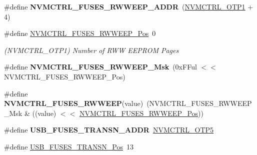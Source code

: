 \begin{DoxyCompactItemize}
\item 
\hypertarget{group__fuses__api_gaeaad17675b84606139dae49e014c6807}{}\#define {\bfseries N\+V\+M\+C\+T\+R\+L\+\_\+\+F\+U\+S\+E\+S\+\_\+\+R\+W\+W\+E\+E\+P\+\_\+\+A\+D\+D\+R}~(\hyperlink{group___s_a_m_l21_j18_a__base_ga6ebf76a96eae94342ff79fce4311baf3}{N\+V\+M\+C\+T\+R\+L\+\_\+\+O\+T\+P1} + 4)\label{group__fuses__api_gaeaad17675b84606139dae49e014c6807}

\item 
\hypertarget{group__fuses__api_ga0b9983a33a9d13a204312f12057b5be8}{}\#define \hyperlink{group__fuses__api_ga0b9983a33a9d13a204312f12057b5be8}{N\+V\+M\+C\+T\+R\+L\+\_\+\+F\+U\+S\+E\+S\+\_\+\+R\+W\+W\+E\+E\+P\+\_\+\+Pos}~0\label{group__fuses__api_ga0b9983a33a9d13a204312f12057b5be8}

\begin{DoxyCompactList}\small\item\em (N\+V\+M\+C\+T\+R\+L\+\_\+\+O\+T\+P1) Number of R\+W\+W E\+E\+P\+R\+O\+M Pages \end{DoxyCompactList}\item 
\hypertarget{group__fuses__api_ga047469bca15d4a60e2b53e25d83b051d}{}\#define {\bfseries N\+V\+M\+C\+T\+R\+L\+\_\+\+F\+U\+S\+E\+S\+\_\+\+R\+W\+W\+E\+E\+P\+\_\+\+Msk}~(0x\+F\+Ful $<$$<$ N\+V\+M\+C\+T\+R\+L\+\_\+\+F\+U\+S\+E\+S\+\_\+\+R\+W\+W\+E\+E\+P\+\_\+\+Pos)\label{group__fuses__api_ga047469bca15d4a60e2b53e25d83b051d}

\item 
\hypertarget{group__fuses__api_ga5482fd133dbb9b043c364773baaab2bf}{}\#define {\bfseries N\+V\+M\+C\+T\+R\+L\+\_\+\+F\+U\+S\+E\+S\+\_\+\+R\+W\+W\+E\+E\+P}(value)~(N\+V\+M\+C\+T\+R\+L\+\_\+\+F\+U\+S\+E\+S\+\_\+\+R\+W\+W\+E\+E\+P\+\_\+\+Msk \& ((value) $<$$<$ \hyperlink{group__fuses__api_ga0b9983a33a9d13a204312f12057b5be8}{N\+V\+M\+C\+T\+R\+L\+\_\+\+F\+U\+S\+E\+S\+\_\+\+R\+W\+W\+E\+E\+P\+\_\+\+Pos}))\label{group__fuses__api_ga5482fd133dbb9b043c364773baaab2bf}

\item 
\hypertarget{group__fuses__api_gac987d8deebc5d8592e0a953fb5d1e9ac}{}\#define {\bfseries U\+S\+B\+\_\+\+F\+U\+S\+E\+S\+\_\+\+T\+R\+A\+N\+S\+N\+\_\+\+A\+D\+D\+R}~\hyperlink{group___s_a_m_l21_j18_a__base_ga0bf5d3de41242cbb1e7b91ef11d6b794}{N\+V\+M\+C\+T\+R\+L\+\_\+\+O\+T\+P5}\label{group__fuses__api_gac987d8deebc5d8592e0a953fb5d1e9ac}

\item 
\hypertarget{group__fuses__api_gab0e7f93b7c247b3159128648a749719f}{}\#define \hyperlink{group__fuses__api_gab0e7f93b7c247b3159128648a749719f}{U\+S\+B\+\_\+\+F\+U\+S\+E\+S\+\_\+\+T\+R\+A\+N\+S\+N\+\_\+\+Pos}~13\label{group__fuses__api_gab0e7f93b7c247b3159128648a749719f}


\end{DoxyCompactItemize}
